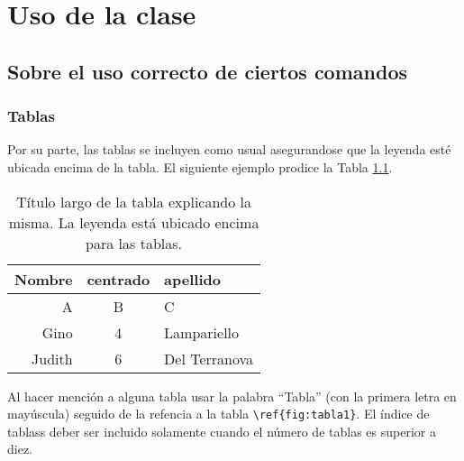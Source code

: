 \chapter{Uso de la clase}

\section{Sobre el uso correcto de ciertos comandos}
\subsection{Tablas}
\par Por su parte, las tablas se incluyen como usual asegurandose que la leyenda est\'e ubicada encima de la tabla. El siguiente ejemplo prodice la Tabla \ref{tbl:tabla1}.
\begin{table}
\begin{center}
\caption[T\'itulo corto]{T\'itulo largo de la tabla explicando la misma. La leyenda est\'a ubicado encima para las tablas.}
\label{tbl:tabla1}
\begin{tabular}{rcl}
\hline
Nombre & centrado & apellido\\
\hline
A & B & C \\
Gino & 4 & Lampariello \\
Judith & 6 & Del Terranova\\
\hline
\end{tabular}
\end{center}
\end{table}
\par Al hacer menci\'on a alguna tabla usar la palabra ``Tabla'' (con la primera letra en may\'uscula) seguido de la refencia a la tabla \verb+\ref{fig:tabla1}+. El \'indice de tablass deber ser incluido solamente cuando el n\'umero de tablas es superior a diez.
